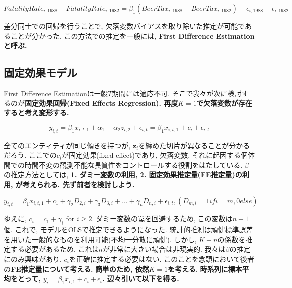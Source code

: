 \documentclass[paper=a4paper,fontsize=10pt]{jlreq}
\begin{document}
\begin{equation*}
  FatalityRate_{i,1988} - FatalityRate_{i,1982} = \beta_1 (BeerTax_{i,1988} - BeerTax_{i,1982}) + \epsilon_{i,1988} - \epsilon_{i,1982}
\end{equation*}

差分同士での回帰を行うことで, 欠落変数バイアスを取り除いた推定が可能であることが分かった. この方法での推定を一般には, \rmfamily\mcfamily\bfseries{First Difference Estimation}\mdseries と呼ぶ.\\

\subsection{固定効果モデル}
First Difference Estimationは一般$T$期間には適応不可. そこで我々が次に検討するのが\rmfamily\mcfamily\bfseries{固定効果回帰(Fixed Effects Regression)}\mdseries . 再度$K = 1$で欠落変数が存在すると考え変形する.

\begin{equation*}
  y_{i,t} = \beta_1 {x}_{i,t,1} + \alpha_1 + \alpha_2 z_{i,2} + \epsilon_{i,t} = \beta_1 {x}_{i,t,1} + c_i + \epsilon_{i,t}
\end{equation*} 

全てのエンティティが同じ傾きを持つが, $\mathbf{z}_i$を纏めた切片が異なることが分かるだろう. ここでの$c_i$が固定効果(fixed effect)であり, 欠落変数, それに起因する個体間での時間不変の観測不能な異質性をコントロールする役割をはたしている. $\beta$の推定方法としては, \rmfamily\mcfamily\bfseries{1. ダミー変数の利用}\mdseries , \rmfamily\mcfamily\bfseries{2. 固定効果推定量(FE推定量)の利用}\mdseries , が考えられる. 先ず前者を検討しよう. 

\begin{equation*}
  y_{i,t} = \beta_1 x_{i,t,1} + c_1 + \gamma_2 D_{2,i} + \gamma_3 D_{3,i} + \dots + \gamma_n D_{n,i} + \epsilon_{i,t},　(D_{m,i} = 1　if　i=m,　0　else)
\end{equation*}

ゆえに, $c_i = c_1 + \gamma_i$ for $i \geq 2$. ダミー変数の罠を回避するため, この変数は$n-1$個. これで, モデルをOLSで推定できるようになった. 統計的推測は頑健標準誤差を用いた一般的なものを利用可能(不均一分散に頑健). しかし, $K + n$の係数を推定する必要があるため, これは$n$が非常に大きい場合は非現実的. 我々は$\beta$の推定にのみ興味があり, $c_i$を正確に推定する必要はない. このことを念頭において後者の\rmfamily\mcfamily\bfseries{FE推定量}\mdseries について考える. 簡単のため, 依然$K = 1$を考える. 時系列に標本平均をとって, $\bar{y}_i = \beta_1 \bar{x}_{i,1} + c_i + \bar{\epsilon}_i$. 辺々引いて以下を得る. 
\end{document}

